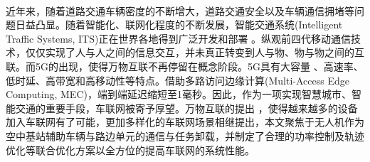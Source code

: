 \makeatletter
{}
  \pagestyle{fancy}%
  \fancyhf{}
\makeatother
\newpage\ \vspace{-2.5em}
\begin{center}
\vspace{0.4cm}   %
\makeatletter
{}  %
\makeatother
\end{center}
\vspace{0.7cm}   %
近年来，随着道路交通车辆密度的不断增大，道路交通安全以及车辆通信拥堵等问题日益凸显。随着智能化、联网化程度的不断发展，智能交通系统(Intelligent Traffic Systems, ITS)正在世界各地得到广泛开发和部署
。纵观前四代移动通信技术，仅仅实现了人与人之间的信息交互，并未真正转变到人与物、物与物之间的互联。而5G的出现，使得万物互联不再停留在概念阶段。5G具有大容量
、高速率、低时延、高带宽和高移动性等特点。借助多路访问边缘计算(Multi-Access Edge Computing, MEC)，端到端延迟缩短至1毫秒。因此，作为一项实现智慧城市、智能交通的重要手段，车联网被寄予厚望。万物互联的提出
，使得越来越多的设备加入车联网有了可能，更加多样化的车联网场景相继提出，本文聚焦于无人机作为空中基站辅助车辆与路边单元的通信与任务卸载，并制定了合理的功率控制及轨迹优化等联合优化方案以全方位的提高车联网的系统性能。


